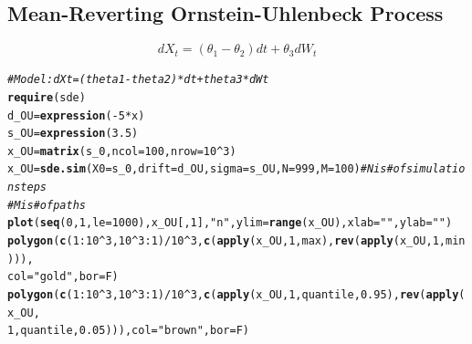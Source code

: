 \documentclass[10pt]{article}\usepackage[]{graphicx}\usepackage[]{color}
\makeatletter
\newcommand{\hlnum}[1]{\textcolor[rgb]{0.686,0.059,0.569}{#1}}%
\newcommand{\hlstr}[1]{\textcolor[rgb]{0.192,0.494,0.8}{#1}}%
\newcommand{\hlcom}[1]{\textcolor[rgb]{0.678,0.584,0.686}{\textit{#1}}}%
\newcommand{\hlopt}[1]{\textcolor[rgb]{0,0,0}{#1}}%
\newcommand{\hlstd}[1]{\textcolor[rgb]{0.345,0.345,0.345}{#1}}%
\newcommand{\hlkwb}[1]{\textcolor[rgb]{0.69,0.353,0.396}{#1}}%
\newcommand{\hlkwc}[1]{\textcolor[rgb]{0.333,0.667,0.333}{#1}}%
\newcommand{\hlkwd}[1]{\textcolor[rgb]{0.737,0.353,0.396}{\textbf{#1}}}%
\newenvironment{kframe}{%
 \def\at@end@of@kframe{}%
 \ifinner\ifhmode%
  \def\at@end@of@kframe{\end{minipage}}%
  \begin{minipage}{\columnwidth}%
 \fi\fi%
 \def\FrameCommand##1{\hskip\@totalleftmargin \hskip-\fboxsep
 \colorbox{shadecolor}{##1}\hskip-\fboxsep
     \hskip-\linewidth \hskip-\@totalleftmargin \hskip\columnwidth}%
 \MakeFramed {\advance\hsize-\width
   \@totalleftmargin\z@ \linewidth\hsize
   \@setminipage}}%
 {\par\unskip\endMakeFramed%
 \at@end@of@kframe}
\newenvironment{knitrout}{}{} %
\makeatother
\begin{document}
\subsection{Mean-Reverting Ornstein-Uhlenbeck Process}
$$dX_t=(\theta_1-\theta_2) dt+\theta_3 dW_t$$
\begin{knitrout}
\color{fgcolor}\begin{kframe}
\begin{alltt}
\hlcom{# Model: dXt=(theta1-theta2)*dt+theta3*dWt}
\hlkwd{require}\hlstd{(sde)}
\hlstd{d_OU} \hlkwb{=} \hlkwd{expression}\hlstd{(}\hlopt{-}\hlnum{5} \hlopt{*} \hlstd{x)}
\hlstd{s_OU} \hlkwb{=} \hlkwd{expression}\hlstd{(}\hlnum{3.5}\hlstd{)}
\hlstd{x_OU} \hlkwb{=} \hlkwd{matrix}\hlstd{(s_0,} \hlkwc{ncol} \hlstd{=} \hlnum{100}\hlstd{,} \hlkwc{nrow} \hlstd{=} \hlnum{10}\hlopt{^}\hlnum{3}\hlstd{)}
\hlstd{x_OU} \hlkwb{=} \hlkwd{sde.sim}\hlstd{(}\hlkwc{X0} \hlstd{= s_0,} \hlkwc{drift} \hlstd{= d_OU,} \hlkwc{sigma} \hlstd{= s_OU,} \hlkwc{N} \hlstd{=} \hlnum{999}\hlstd{,} \hlkwc{M} \hlstd{=} \hlnum{100}\hlstd{)}  \hlcom{#N is # of simulation steps}
\hlcom{# M is # of paths}
\hlkwd{plot}\hlstd{(}\hlkwd{seq}\hlstd{(}\hlnum{0}\hlstd{,} \hlnum{1}\hlstd{,} \hlkwc{le} \hlstd{=} \hlnum{1000}\hlstd{), x_OU[,} \hlnum{1}\hlstd{],} \hlstr{"n"}\hlstd{,} \hlkwc{ylim} \hlstd{=} \hlkwd{range}\hlstd{(x_OU),} \hlkwc{xlab} \hlstd{=} \hlstr{""}\hlstd{,} \hlkwc{ylab} \hlstd{=} \hlstr{""}\hlstd{)}
\hlkwd{polygon}\hlstd{(}\hlkwd{c}\hlstd{(}\hlnum{1}\hlopt{:}\hlnum{10}\hlopt{^}\hlnum{3}\hlstd{,} \hlnum{10}\hlopt{^}\hlnum{3}\hlopt{:}\hlnum{1}\hlstd{)}\hlopt{/}\hlnum{10}\hlopt{^}\hlnum{3}\hlstd{,} \hlkwd{c}\hlstd{(}\hlkwd{apply}\hlstd{(x_OU,} \hlnum{1}\hlstd{, max),} \hlkwd{rev}\hlstd{(}\hlkwd{apply}\hlstd{(x_OU,} \hlnum{1}\hlstd{, min))),}
    \hlkwc{col} \hlstd{=} \hlstr{"gold"}\hlstd{,} \hlkwc{bor} \hlstd{= F)}
\hlkwd{polygon}\hlstd{(}\hlkwd{c}\hlstd{(}\hlnum{1}\hlopt{:}\hlnum{10}\hlopt{^}\hlnum{3}\hlstd{,} \hlnum{10}\hlopt{^}\hlnum{3}\hlopt{:}\hlnum{1}\hlstd{)}\hlopt{/}\hlnum{10}\hlopt{^}\hlnum{3}\hlstd{,} \hlkwd{c}\hlstd{(}\hlkwd{apply}\hlstd{(x_OU,} \hlnum{1}\hlstd{, quantile,} \hlnum{0.95}\hlstd{),} \hlkwd{rev}\hlstd{(}\hlkwd{apply}\hlstd{(x_OU,}
    \hlnum{1}\hlstd{, quantile,} \hlnum{0.05}\hlstd{))),} \hlkwc{col} \hlstd{=} \hlstr{"brown"}\hlstd{,} \hlkwc{bor} \hlstd{= F)}
\end{alltt}
\end{kframe}


\end{knitrout}
\end{document}
